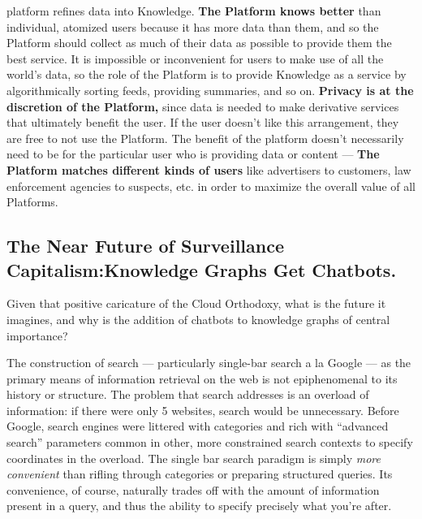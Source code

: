 platform refines data into Knowledge. \textbf{The Platform knows better} than individual,
atomized users because it has more data than them, and so the Platform
should collect as much of their data as possible to provide them the
best service. It is impossible or inconvenient for users to make use of
all the world's data, so the role of the Platform is to provide
Knowledge as a service by algorithmically sorting feeds, providing
summaries, and so on. \textbf{Privacy is at the discretion of the
Platform,} since data is needed to make derivative services that
ultimately benefit the user. If the user doesn't like this arrangement,
they are free to not use the Platform. The benefit of the platform
doesn't necessarily need to be for the particular user who is providing
data or content --- \textbf{The Platform matches different kinds of
users} like advertisers to customers, law enforcement agencies to
suspects, etc. in order to maximize the overall value of all Platforms.

\hypertarget{the-near-future-of-surveillance-capitalism-knowledge-graphs-get-chatbots.}{%
\subsection{The Near Future of Surveillance Capitalism:\hfill\break Knowledge Graphs
Get
Chatbots.}\label{the-near-future-of-surveillance-capitalism-knowledge-graphs-get-chatbots.}}

Given that positive caricature of the Cloud Orthodoxy, what is the
future it imagines, and why is the addition of chatbots to knowledge
graphs of central importance?

The construction of search --- particularly single-bar search a la
Google --- as the primary means of information retrieval on the web is
not epiphenomenal to its history or structure. The problem that search
addresses is an overload of information: if there were only 5 websites,
search would be unnecessary. Before Google, search engines were littered
with categories and rich with ``advanced search'' parameters common in
other, more constrained search contexts to specify coordinates in the
overload. The single bar search paradigm is simply \emph{more
convenient} than rifling through categories or preparing structured
queries. Its convenience, of course, naturally trades off with the
amount of information present in a query, and thus the ability to
specify precisely what you're after.

